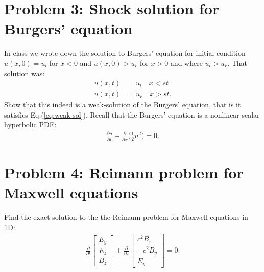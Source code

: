 \documentclass[11pt]{article}
\newcommand{\eqr}[1]{Eq.\thinspace(#1)}
\newcommand{\pfrac}[2]{\frac{\partial #1}{\partial #2}}
\begin{document}
\section*{Problem 3: Shock solution for Burgers' equation}

In class we wrote down the solution to Burgers' equation for initial
condition $u(x,0) = u_l$ for $x<0$ and $u(x,0) > u_r$ for $x>0$ and
where $u_l > u_r$. That solution was:
\begin{align*}
  u(x,t) &= u_l \quad x < st \\
  u(x,t) &= u_r \quad x > st.
\end{align*}
Show that this indeed is a weak-solution of the Burgers' equation,
that is it satisfies \eqr{\ref{eq:weak-sol}}. Recall that the Burgers'
equation is a nonlinear scalar hyperbolic PDE:
\begin{align*}
    \pfrac{u}{t} + \frac{\partial}{\partial x}\bigg( \frac{1}{2} u^2
    \bigg) = 0.  
\end{align*}

\section*{Problem 4: Reimann problem for Maxwell equations}

Find the exact solution to the the Reimann problem for Maxwell
equations in 1D:
\begin{align*}
  \frac{\partial }{\partial t}
  \left[
    \begin{matrix}
      E_y \\
      E_z \\
      B_z
    \end{matrix}
  \right]
  +
  \frac{\partial }{\partial x}
  \left[
    \begin{matrix}
      c^2B_z \\
      -c^2B_y \\
      E_y
    \end{matrix}
  \right]
  =
  0.
\end{align*}
\end{document}
